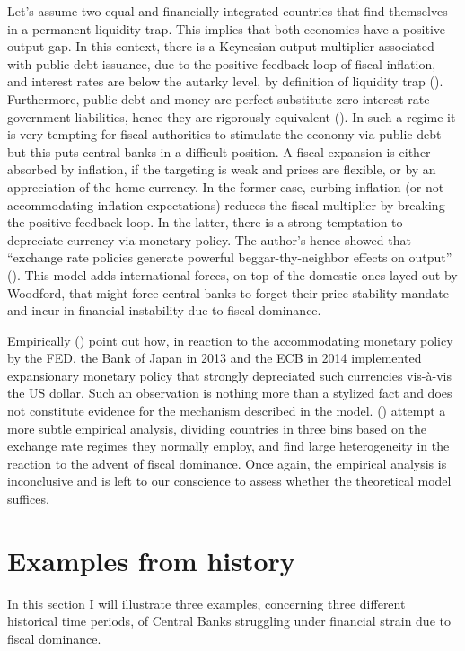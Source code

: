 \documentclass[american]{scrartcl}
\newcommand{\citein}[1]{\citeauthor{#1} (\citeyear{#1})}
\begin{document}
Let's assume two equal and financially integrated countries that find themselves in a permanent liquidity trap. This implies that both economies have a positive output gap. In this context, there is a Keynesian output multiplier associated with public debt issuance, due to the positive feedback loop of fiscal inflation, and interest rates are below the autarky level, by definition of liquidity trap (\cite[p. 41]{Caballero2016}). Furthermore, public debt and money are perfect substitute zero interest rate government liabilities, hence they are rigorously equivalent (\cite[p. 42]{Caballero2016}). In such a regime it is very tempting for fiscal authorities to stimulate the economy via public debt but this puts central banks in a difficult position. A fiscal expansion is either absorbed by inflation, if the targeting is weak and prices are flexible, or by an appreciation of the home currency. In the former case, curbing inflation (or not accommodating inflation expectations) reduces the fiscal multiplier by breaking the positive feedback loop. In the latter, there is a strong temptation to depreciate currency via monetary policy. The author's hence showed that ``exchange rate policies generate powerful beggar-thy-neighbor effects on output'' (\cite[p. 32]{Caballero2016}). This model adds international forces, on top of the domestic ones layed out by Woodford, that might force central banks to forget their price stability mandate and incur in financial instability due to fiscal dominance.

Empirically \citein{Caballero2016} point out how, in reaction to the accommodating monetary policy by the FED, the Bank of Japan in 2013 and the ECB in 2014 implemented expansionary monetary policy that strongly depreciated such currencies vis-à-vis the US dollar. Such an observation is nothing more than a stylized fact and does not constitute evidence for the mechanism described in the model. \citein{Ahmed2021} attempt a more subtle empirical analysis, dividing countries in three bins based on the exchange rate regimes they normally employ, and find large heterogeneity in the reaction to the advent of fiscal dominance. Once again, the empirical analysis is inconclusive and is left to our conscience to assess whether the theoretical model suffices.

\section{Examples from history}

In this section I will illustrate three examples, concerning three different historical time periods, of Central Banks struggling under financial strain due to fiscal dominance.
\end{document}
